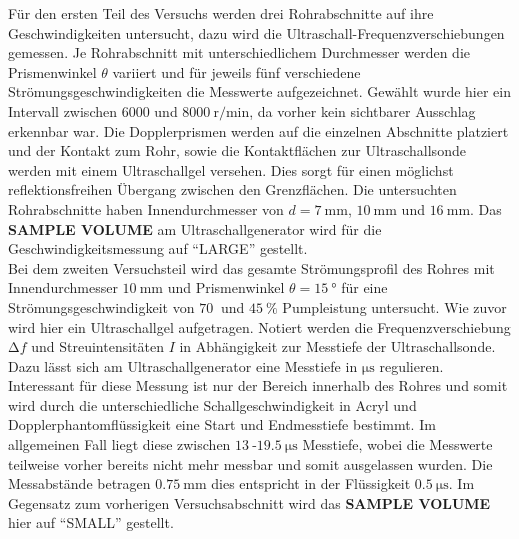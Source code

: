 Für den ersten Teil des Versuchs werden drei Rohrabschnitte auf ihre Geschwindigkeiten untersucht, dazu wird die Ultraschall-Frequenzverschiebungen gemessen. Je Rohrabschnitt mit unterschiedlichem Durchmesser werden die Prismenwinkel
$\theta$ variiert und für jeweils fünf verschiedene Strömungsgeschwindigkeiten die Messwerte aufgezeichnet. Gewählt wurde hier ein Intervall zwischen $6000$ und $\SI{8000}{{\text{r}}\per\minute}$, da vorher kein sichtbarer Ausschlag erkennbar war.
 Die Dopplerprismen werden auf die einzelnen Abschnitte platziert und der Kontakt zum Rohr, sowie die Kontaktflächen zur Ultraschallsonde
werden mit einem Ultraschallgel versehen. Dies sorgt für einen möglichst reflektionsfreihen Übergang zwischen den Grenzflächen.
Die untersuchten Rohrabschnitte haben Innendurchmesser von $d = \SI{7}{\milli\meter}$, $\SI{10}{\milli\meter}$ und $\SI{16}{\milli\meter}$. Das \textbf{SAMPLE VOLUME} am Ultraschallgenerator wird für die Geschwindigkeitsmessung
auf \enquote{LARGE} gestellt.
\\
\newline
Bei dem zweiten Versuchsteil wird das gesamte Strömungsprofil des Rohres mit Innendurchmesser $\SI{10}{\milli\meter}$ und Prismenwinkel $\theta = \SI{15}{\degree}$ für eine Strömungsgeschwindigkeit von $\SI{70}{}$ und $\SI{45}{\percent}$ Pumpleistung untersucht. Wie zuvor wird hier ein Ultraschallgel aufgetragen. 
Notiert werden die Frequenzverschiebung $\increment f$ und Streuintensitäten $I$ in Abhängigkeit zur Messtiefe der Ultraschallsonde. Dazu lässt sich am Ultraschallgenerator eine Messtiefe in $\si{\micro\second}$ regulieren. 
Interessant für diese Messung ist nur der Bereich innerhalb des Rohres und somit wird durch die unterschiedliche Schallgeschwindigkeit in Acryl und Dopplerphantomflüssigkeit eine Start und Endmesstiefe bestimmt. Im allgemeinen
Fall liegt diese zwischen $\SI{13}{}$-$\SI{19.5}{\micro\second}$ Messtiefe, wobei die Messwerte teilweise vorher bereits nicht mehr messbar und somit ausgelassen wurden. Die Messabstände betragen $\SI{0.75}{\milli\meter}$ dies entspricht
in der Flüssigkeit $\SI{0.5}{\micro\second}$. Im Gegensatz zum vorherigen Versuchsabschnitt wird das \textbf{SAMPLE VOLUME} hier auf \enquote{SMALL} gestellt.
